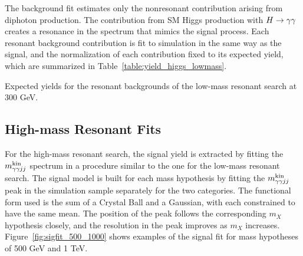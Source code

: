 The background fit estimates only the nonresonant contribution arising from diphoton
production. The contribution from SM Higgs production with $H\to\gamma\gamma$ creates a resonance in the
spectrum that mimics the signal process. Each resonant background
contribution is fit to simulation in the same way as the signal,
and the normalization of each contribution fixed to its expected yield, which are summarized
in Table~\ref{table:yield_higgs_lowmass}.

\begin{table}[htbp!]
  \centering
  \renewcommand{\arraystretch}{1.4}
  \caption{Expected yields for the resonant backgrounds of the low-mass resonant search at 300 GeV.}
  
  \label{table:yield_higgs_lowmass}
\end{table}

\subsection{High-mass Resonant Fits}

For the high-mass resonant search, the signal yield is extracted by fitting the $m_{\gamma\gamma jj}^{\rm kin}$ spectrum
in a procedure similar to the one for the low-mass resonant search. The signal model is built
for each mass hypothesis by fitting the $m_{\gamma\gamma jj}^{\rm kin}$ peak in the simulation sample separately for the
two categories. The functional form used is the sum of a Crystal Ball and a Gaussian, with each
constrained to have the same mean. The position of the peak follows the corresponding $m_X$
hypothesis closely,
and the resolution in the peak improves as $m_X$ increases. Figure~\ref{fig:sigfit_500_1000}
shows examples of the signal fit for mass hypotheses of 500 GeV and 1 TeV.

